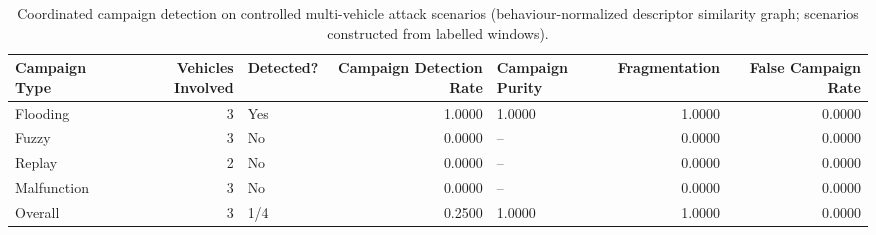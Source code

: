 \begin{table}[t]
\centering
\begin{tabular}{lrlrlrr}
\toprule
Campaign Type & Vehicles Involved & Detected? & Campaign Detection Rate & Campaign Purity & Fragmentation & False Campaign Rate \\
\midrule
Flooding & 3 & Yes & 1.0000 & 1.0000 & 1.0000 & 0.0000 \\
Fuzzy & 3 & No & 0.0000 & -- & 0.0000 & 0.0000 \\
Replay & 2 & No & 0.0000 & -- & 0.0000 & 0.0000 \\
Malfunction & 3 & No & 0.0000 & -- & 0.0000 & 0.0000 \\
Overall & 3 & 1/4 & 0.2500 & 1.0000 & 1.0000 & 0.0000 \\
\bottomrule
\end{tabular}
\caption{Coordinated campaign detection on controlled multi-vehicle attack scenarios (behaviour-normalized descriptor similarity graph; scenarios constructed from labelled windows).}
\label{tab:campaign-detection-results}
\end{table}
